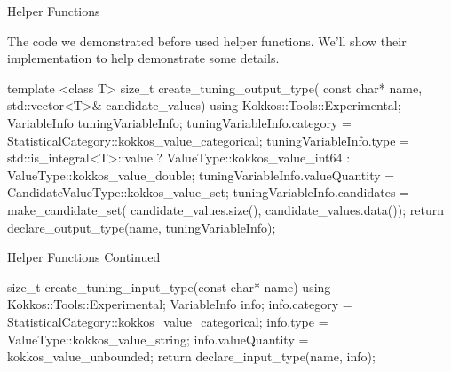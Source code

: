 \begin{frame}[fragile]{Helper Functions}

The code we demonstrated before used helper functions. We'll show their
implementation to help demonstrate some details.

\begin{code}[keywords={get_new_context_id,begin_context,end_context,VariableInfo,
	               StatisticalCategory,kokkos_value_catgorical,ValueTYpe,
		       kokkos_value_int64,kokkos_value_double,valueQuantity,CandidateValueType,
		       kokkos_value_set,make_candidate_set,declare_output_type}]
template <class T>
size_t create_tuning_output_type(
    const char* name,
    std::vector<T>& candidate_values) {
  using Kokkos::Tools::Experimental;
  VariableInfo tuningVariableInfo;
  tuningVariableInfo.category =
      StatisticalCategory::kokkos_value_categorical;
  tuningVariableInfo.type = std::is_integral<T>::value ?
      ValueType::kokkos_value_int64 :
      ValueType::kokkos_value_double;
  tuningVariableInfo.valueQuantity =
      CandidateValueType::kokkos_value_set;
  tuningVariableInfo.candidates = make_candidate_set(
      candidate_values.size(),
      candidate_values.data());  
  return declare_output_type(name, tuningVariableInfo);
}
\end{code}
\end{frame}
\begin{frame}[fragile]{Helper Functions Continued}

\begin{code}[keywords={get_new_context_id,begin_context,end_context,VariableInfo,
	               StatiscalCategory,kokkos_value_categorical,kokkos_value_string,
		       kokkos_value_unbounded,declare_inpute_type,valueQuantity}]
size_t create_tuning_input_type(const char* name) {
  using Kokkos::Tools::Experimental;
  VariableInfo info;
  info.category = StatisticalCategory::kokkos_value_categorical;
  info.type = ValueType::kokkos_value_string;
  info.valueQuantity = kokkos_value_unbounded;
  return declare_input_type(name, info);
}
\end{code}


\end{frame}

